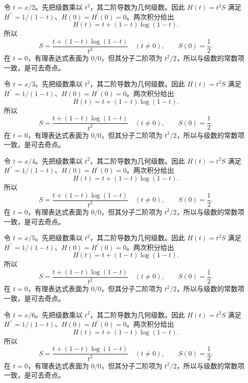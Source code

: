 \documentclass[12pt,fontset=fandol]{ctexart}
\begin{document}
\begin{solve}\label{ans:c27q14}
令 $t=x/2$。先把级数乘以 $t^2$，其二阶导数为几何级数。因此 $H(t)=t^2S$ 满足 $H^{\prime\prime}=1/(1-t)$、$H(0)=H^{\prime}(0)=0$。两次积分给出
\[
H(t)=t+(1-t)\log(1-t).
\]
所以
\[
S=\frac{t+(1-t)\log(1-t)}{t^2}\quad(t\ne0),\qquad S(0)=\frac12.
\]
在 $t=0$，有理表达式表面为 $0/0$，但其分子二阶项为 $t^2/2$，所以与级数的常数项一致，是可去奇点。
\end{solve}

\begin{solve}\label{ans:c27q15}
令 $t=x/3$。先把级数乘以 $t^2$，其二阶导数为几何级数。因此 $H(t)=t^2S$ 满足 $H^{\prime\prime}=1/(1-t)$、$H(0)=H^{\prime}(0)=0$。两次积分给出
\[
H(t)=t+(1-t)\log(1-t).
\]
所以
\[
S=\frac{t+(1-t)\log(1-t)}{t^2}\quad(t\ne0),\qquad S(0)=\frac12.
\]
在 $t=0$，有理表达式表面为 $0/0$，但其分子二阶项为 $t^2/2$，所以与级数的常数项一致，是可去奇点。
\end{solve}

\begin{solve}\label{ans:c27q16}
令 $t=x/4$。先把级数乘以 $t^2$，其二阶导数为几何级数。因此 $H(t)=t^2S$ 满足 $H^{\prime\prime}=1/(1-t)$、$H(0)=H^{\prime}(0)=0$。两次积分给出
\[
H(t)=t+(1-t)\log(1-t).
\]
所以
\[
S=\frac{t+(1-t)\log(1-t)}{t^2}\quad(t\ne0),\qquad S(0)=\frac12.
\]
在 $t=0$，有理表达式表面为 $0/0$，但其分子二阶项为 $t^2/2$，所以与级数的常数项一致，是可去奇点。
\end{solve}

\begin{solve}\label{ans:c27q17}
令 $t=x/5$。先把级数乘以 $t^2$，其二阶导数为几何级数。因此 $H(t)=t^2S$ 满足 $H^{\prime\prime}=1/(1-t)$、$H(0)=H^{\prime}(0)=0$。两次积分给出
\[
H(t)=t+(1-t)\log(1-t).
\]
所以
\[
S=\frac{t+(1-t)\log(1-t)}{t^2}\quad(t\ne0),\qquad S(0)=\frac12.
\]
在 $t=0$，有理表达式表面为 $0/0$，但其分子二阶项为 $t^2/2$，所以与级数的常数项一致，是可去奇点。
\end{solve}

\begin{solve}\label{ans:c27q18}
令 $t=x/6$。先把级数乘以 $t^2$，其二阶导数为几何级数。因此 $H(t)=t^2S$ 满足 $H^{\prime\prime}=1/(1-t)$、$H(0)=H^{\prime}(0)=0$。两次积分给出
\[
H(t)=t+(1-t)\log(1-t).
\]
所以
\[
S=\frac{t+(1-t)\log(1-t)}{t^2}\quad(t\ne0),\qquad S(0)=\frac12.
\]
在 $t=0$，有理表达式表面为 $0/0$，但其分子二阶项为 $t^2/2$，所以与级数的常数项一致，是可去奇点。
\end{solve}
\end{document}
